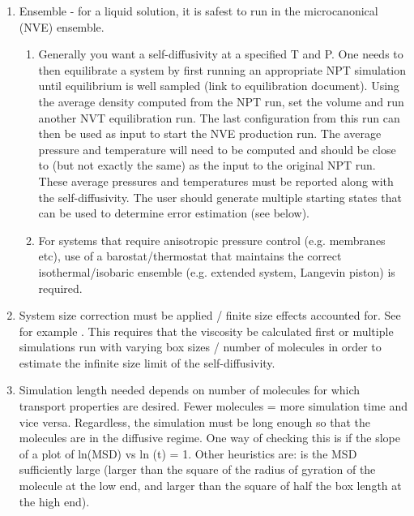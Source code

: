 \documentclass[9pt]{livecoms}
\begin{document}
\begin{enumerate}
	\item Ensemble - for a liquid solution, it is safest to run in the microcanonical (NVE) ensemble. %
	\begin{enumerate}
		\item Generally you want a self-diffusivity at a specified T and P. One needs to then equilibrate a system by first running an appropriate NPT simulation until equilibrium is well sampled (link to equilibration document). Using the average density computed from the NPT run, set the volume and run another NVT equilibration run. The last configuration from this run can then be used as input to start the NVE production run. The average pressure and temperature will need to be computed and should be close to (but not exactly the same) as the input to the original NPT run. These average pressures and temperatures must be reported along with the self-diffusivity. The user should generate multiple starting states that can be used to determine error estimation (see below).
		\item For systems that require anisotropic pressure control (e.g. membranes etc), use of a barostat/thermostat that maintains the correct isothermal/isobaric ensemble (e.g. extended system, Langevin piston) is required.
	\end{enumerate}
	\item System size correction must be applied / finite size effects accounted for. See for example \cite{Yeh2004,Moultos2016}. This requires that the viscosity be calculated first or multiple simulations run with varying box sizes / number of molecules in order to estimate the infinite size limit of the self-diffusivity.
	\item Simulation length needed depends on number of molecules for which transport properties are desired. Fewer molecules = more simulation time and vice versa. Regardless, the simulation must be long enough so that the molecules are in the diffusive regime. One way of checking this is if the slope of a plot of ln(MSD) vs ln (t) = 1. Other heuristics are: is the MSD sufficiently large (larger than the square of the radius of gyration of the molecule at the low end, and larger than the square of half the box length at the high end).

\end{enumerate}
\end{document}
